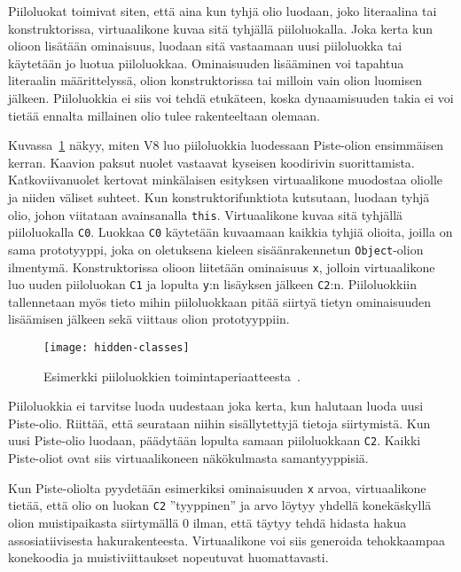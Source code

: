Piiloluokat toimivat siten, että aina kun tyhjä olio luodaan, joko literaalina tai konstruktorissa, virtuaalikone kuvaa sitä tyhjällä piiloluokalla. Joka kerta kun olioon lisätään ominaisuus, luodaan sitä vastaamaan uusi piiloluokka tai käytetään jo luotua piiloluokkaa. Ominaisuuden lisääminen voi tapahtua literaalin määrittelyssä, olion konstruktorissa tai milloin vain olion luomisen jälkeen. Piiloluokkia ei siis voi tehdä etukäteen, koska dynaamisuuden takia ei voi tietää ennalta millainen olio tulee rakenteeltaan olemaan.

Kuvassa~\ref{fig:hiddenclass} näkyy, miten V8 luo piiloluokkia luodessaan Piste-olion ensimmäisen kerran. Kaavion paksut nuolet vastaavat kyseisen koodirivin suorittamista. Katkoviivanuolet kertovat minkälaisen esityksen virtuaalikone muodostaa oliolle ja niiden väliset suhteet. Kun konstruktorifunktiota kutsutaan, luodaan tyhjä olio, johon viitataan avainsanalla \texttt{this}. Virtuaalikone kuvaa sitä tyhjällä piiloluokalla \texttt{C0}. Luokkaa \texttt{C0} käytetään kuvaamaan kaikkia tyhjiä olioita, joilla on sama prototyyppi, joka on oletuksena kieleen sisäänrakennetun \texttt{Object}-olion ilmentymä. Konstruktorissa olioon liitetään ominaisuus \texttt{x}, jolloin virtuaalikone luo uuden piiloluokan \texttt{C1} ja lopulta \texttt{y}:n lisäyksen jälkeen \texttt{C2}:n. Piiloluokkiin tallennetaan myös tieto mihin piiloluokkaan pitää siirtyä tietyn ominaisuuden lisäämisen jälkeen sekä viittaus olion prototyyppiin.

\begin{figure}[ht]
    \texttt{[image: hidden-classes]}
    \caption{Esimerkki piiloluokkien toimintaperiaatteesta~\cite{v8design}.}
     \centering
     \label{fig:hiddenclass}
\end{figure}

Piiloluokkia ei tarvitse luoda uudestaan joka kerta, kun halutaan luoda uusi Piste-olio. Riittää, että seurataan niihin sisällytettyjä tietoja siirtymistä. Kun uusi Piste-olio luodaan, päädytään lopulta samaan piiloluokkaan \texttt{C2}. Kaikki Piste-oliot ovat siis virtuaalikoneen näkökulmasta samantyyppisiä.

Kun Piste-oliolta pyydetään esimerkiksi ominaisuuden \texttt{x} arvoa, virtuaalikone tietää, että olio on luokan \texttt{C2} ''tyyppinen'' ja arvo löytyy yhdellä konekäskyllä olion muistipaikasta siirtymällä 0 ilman, että täytyy tehdä hidasta hakua assosiatiivisesta hakurakenteesta. Virtuaalikone voi siis generoida tehokkaampaa konekoodia ja muistiviittaukset nopeutuvat huomattavasti.

